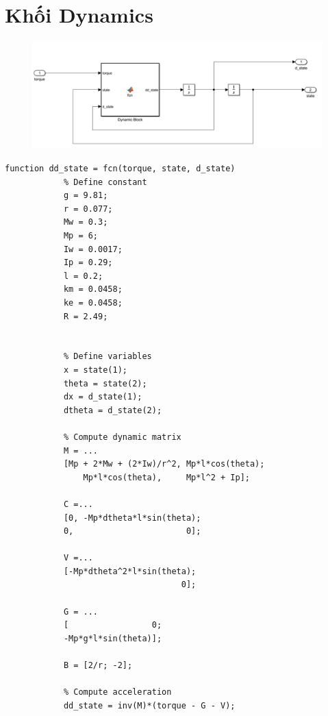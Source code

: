     \section{Khối Dynamics}
    \begin{figure}[H]
        \centering
        \includegraphics[width=1\textwidth]{pictures/dynamic_ctc.png}
    \end{figure}
    \begin{lstlisting}[caption={Code khối Dynamic Block}, label={lst:pz}]
        function dd_state = fcn(torque, state, d_state)
            % Define constant
            g = 9.81;
            r = 0.077;
            Mw = 0.3;
            Mp = 6;
            Iw = 0.0017;
            Ip = 0.29;
            l = 0.2;
            km = 0.0458;
            ke = 0.0458;
            R = 2.49;
        
        
            % Define variables
            x = state(1);
            theta = state(2);
            dx = d_state(1);
            dtheta = d_state(2);
    
            % Compute dynamic matrix
            M = ... 
            [Mp + 2*Mw + (2*Iw)/r^2, Mp*l*cos(theta);
                Mp*l*cos(theta),     Mp*l^2 + Ip];
            
            C =... 
            [0, -Mp*dtheta*l*sin(theta);
            0,                       0];
            
            V =... 
            [-Mp*dtheta^2*l*sin(theta);
                                    0];
            
            G = ...
            [                 0;
            -Mp*g*l*sin(theta)];
            
            B = [2/r; -2];
            
            % Compute acceleration
            dd_state = inv(M)*(torque - G - V); 
    \end{lstlisting}


